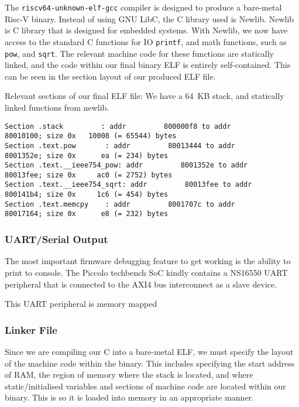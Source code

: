 \documentclass[a4paper,8pt]{report}
\begin{document}
The \texttt{riscv64-unknown-elf-gcc} compiler is designed to produce a
bare-metal Risc-V binary. Instead of using GNU LibC, the C library used is
Newlib. Newlib is C library that is designed for embedded systems. With Newlib,
we now have access to the standard C functions for IO \texttt{printf}, and math
functions, such as \texttt{pow}, and \texttt{sqrt}. The relevant machine code
for these functions are statically linked, and the code within our final binary
ELF is entirely self-contained. This can be seen in the section layout of our
produced ELF file.

Relevant sections of our final ELF file: We have a $64$~KB stack, and statically
linked functions from newlib.  
\tiny
\begin{verbatim}
Section .stack         : addr         800000f8 to addr         80010100; size 0x   10008 (= 65544) bytes
Section .text.pow       : addr         80013444 to addr         8001352e; size 0x      ea (= 234) bytes
Section .text.__ieee754_pow: addr         8001352e to addr         80013fee; size 0x     ac0 (= 2752) bytes
Section .text.__ieee754_sqrt: addr         80013fee to addr         800141b4; size 0x     1c6 (= 454) bytes
Section .text.memcpy    : addr         8001707c to addr         80017164; size 0x      e8 (= 232) bytes
\end{verbatim}
\normalsize

\subsubsection{UART/Serial Output}
The most important firmware debugging feature to get working is the ability to
print to console. The Piccolo techbench SoC kindly contains a NS16550 UART
peripheral that is connected to the AXI4 bus interconnect as a slave device.  

This UART peripheral is memory mapped 


\subsubsection{Linker File}
Since we are compiling our C into a bare-metal ELF, we must specify the layout
of the machine code within the binary. This includes specifying the start
address of RAM, the region of memory where the stack is located, and where
static/initialised variables and sections of machine code are located within our
binary. This is so it is loaded into memory in an appropriate manner.
\end{document}
